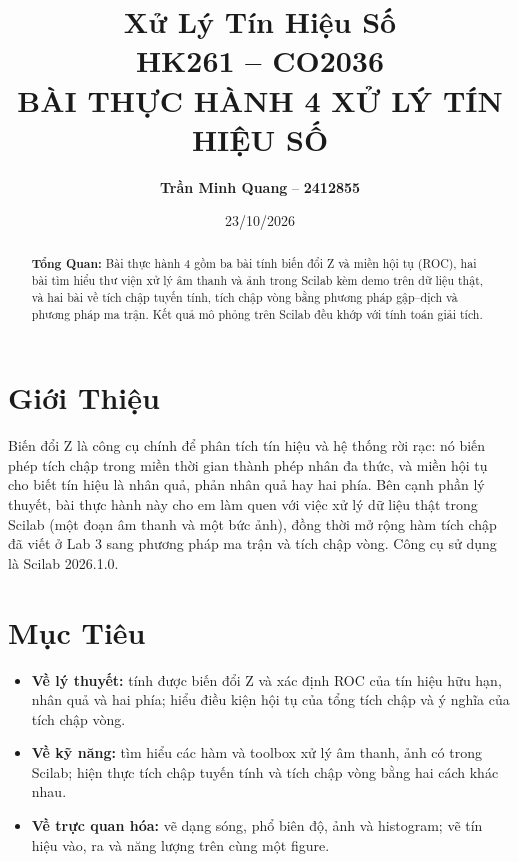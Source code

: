 \documentclass[12pt,a4paper]{article}
\title{
    \vspace{-1.5cm}
    \large\textbf{Xử Lý Tín Hiệu Số} \\
    \normalsize HK261 \quad -- \quad CO2036 \\[1em]
    \Large\textbf{BÀI THỰC HÀNH 4 XỬ LÝ TÍN HIỆU SỐ}
}
\author{
    \textbf{Trần Minh Quang} -- \textbf{2412855}
}
\date{23/10/2026}
\begin{document}
\maketitle

\begin{abstract}
\noindent\textbf{Tổng Quan:} Bài thực hành 4 gồm ba bài tính biến đổi Z và miền hội tụ (ROC), hai bài tìm hiểu thư viện xử lý âm thanh và ảnh trong Scilab kèm demo trên dữ liệu thật, và hai bài về tích chập tuyến tính, tích chập vòng bằng phương pháp gập--dịch và phương pháp ma trận. Kết quả mô phỏng trên Scilab đều khớp với tính toán giải tích.
\end{abstract}

\vspace{0.5cm}

\section{Giới Thiệu}
Biến đổi Z là công cụ chính để phân tích tín hiệu và hệ thống rời rạc: nó biến phép tích chập trong miền thời gian thành phép nhân đa thức, và miền hội tụ cho biết tín hiệu là nhân quả, phản nhân quả hay hai phía. Bên cạnh phần lý thuyết, bài thực hành này cho em làm quen với việc xử lý dữ liệu thật trong Scilab (một đoạn âm thanh và một bức ảnh), đồng thời mở rộng hàm tích chập đã viết ở Lab 3 sang phương pháp ma trận và tích chập vòng. Công cụ sử dụng là Scilab 2026.1.0.

\section{Mục Tiêu}
\begin{itemize}
    \item \textbf{Về lý thuyết:} tính được biến đổi Z và xác định ROC của tín hiệu hữu hạn, nhân quả và hai phía; hiểu điều kiện hội tụ của tổng tích chập và ý nghĩa của tích chập vòng.
    \item \textbf{Về kỹ năng:} tìm hiểu các hàm và toolbox xử lý âm thanh, ảnh có trong Scilab; hiện thực tích chập tuyến tính và tích chập vòng bằng hai cách khác nhau.
    \item \textbf{Về trực quan hóa:} vẽ dạng sóng, phổ biên độ, ảnh và histogram; vẽ tín hiệu vào, ra và năng lượng trên cùng một figure.
\end{itemize}
\end{document}
